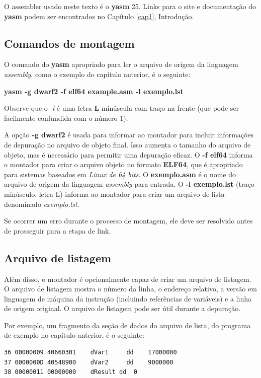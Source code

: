 O assembler usado neste texto é o \textbf{yasm} 25. Links para o site e documentação do \textbf{yasm} podem ser encontrados no Capítulo \ref{cap1}, Introdução.

\subsection{Comandos de montagem}
O comando do \textbf{yasm} apropriado para ler o arquivo de origem da linguagem \textit{assembly}, como o exemplo do capítulo anterior, é o seguinte:
\begin{center}
	\textbf{yasm -g dwarf2 -f elf64 example.asm -l exemplo.lst}
\end{center}

Observe que o \textit{-l} é uma letra \textbf{L} minúscula com traço na frente (que pode ser facilmente confundida com o número $ 1$).

A opção \textbf{-g dwarf2} é usada para informar ao montador para incluir informações de depuração no arquivo de objeto final. Isso aumenta o tamanho do arquivo de objeto, mas é necessário para permitir uma depuração eficaz. O \textbf{-f elf64} informa o montador para criar o arquivo objeto no formato \textbf{ELF64}, que é apropriado para sistemas baseados em \textit{Linux de 64 bits}. O \textbf{exemplo.asm} é o nome do arquivo de origem da linguagem \textit{assembly} para entrada. O \textbf{-l exemplo.lst} (traço minúsculo, letra L) informa ao montador para criar um arquivo de lista denominado \textit{exemplo.lst}.

Se ocorrer um erro durante o processo de montagem, ele deve ser resolvido antes de prosseguir para a etapa de link.

\subsection{Arquivo de listagem}
Além disso, o montador é opcionalmente capaz de criar um arquivo de listagem. O arquivo de listagem mostra o número da linha, o endereço relativo, a versão em linguagem de máquina da instrução (incluindo referências de variáveis) e a linha de origem original. O arquivo de listagem pode ser útil durante a depuração.

Por exemplo, um fragmento da seção de dados do arquivo de lista, do programa de exemplo no capítulo anterior, é o seguinte:

\begin{verbatim}
36 00000009 40660301	dVar1	  dd	17000000
37 0000000D 40548900	dVar2	  dd	9000000
38 00000011 00000000	dResult	dd	0
\end{verbatim}

